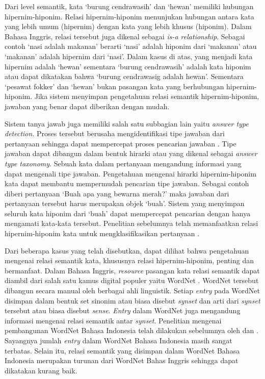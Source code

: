 Dari level semantik, kata `burung cendrawasih' dan `hewan' memiliki hubungan hipernim-hiponim. Relasi hipernim-hiponim menunjukan hubungan antara kata yang lebih umum (hipernim) dengan kata yang lebih khusus (hiponim). Dalam Bahasa Inggris, relasi tersebut juga dikenal sebagai \textit{is-a relationship}. Sebagai contoh `nasi adalah makanan' berarti `nasi' adalah hiponim dari `makanan' atau `makanan' adalah hipernim dari `nasi'. Dalam kasus di atas, yang menjadi kata hipernim adalah `hewan' sementara `burung cendrawasih' adalah kata hiponim atau dapat dikatakan bahwa `burung cendrawasig adalah hewan'. Sementara `pesawat fokker' dan `hewan' bukan pasangan kata yang berhubungan hipernim-hiponim. Jika sistem menyimpan pengetahuan relasi semantik hipernim-hiponim, jawaban yang benar dapat diberikan dengan mudah.

Sistem tanya jawab juga memiliki salah satu subbagian lain yaitu \textit{answer type detection}. Proses tersebut berusaha mengidentifikasi tipe jawaban dari pertanyaan sehingga dapat mempercepat proses pencarian jawaban \citep{jurafsky2000speech}. Tipe jawaban dapat dibangun dalam bentuk hirarki atau yang dikenal sebagai \textit{answer type taxonomy}. Sebuah kata dalam pertanyaan mengandung informasi yang dapat mengenali tipe jawaban. Pengetahuan mengenai hirarki hipernim-hiponim kata dapat membantu mempermudah pencarian tipe jawaban. Sebagai contoh diberi pertanyaan `Buah apa yang bewarna merah?' maka jawaban dari pertanyaan tersebut harus merupakan objek `buah'. Sistem yang menyimpan seluruh kata hiponim dari `buah' dapat mempercepat pencarian dengan hanya mengamati kata-kata tersebut. Penelitian sebelumnya telah memanfaatkan relasi hipernim-hiponim kata untuk mengklasifikasikan pertanyaan \citep{huang2008question}.

Dari beberapa kasus yang telah disebutkan, dapat dilihat bahwa pengetahuan mengenai relasi semantik kata, khususnya relasi hipernim-hiponim, penting dan bermanfaat. Dalam Bahasa Inggris, \textit{resource} pasangan kata relasi semantik dapat diambil dari salah satu kamus digital populer yaitu WordNet \citep{fellbaum1998wordnet}. WordNet tersebut dibangun secara manual oleh berbagai ahli linguistik. Setiap \textit{entry} pada WordNet disimpan dalam bentuk set sinonim atau biasa disebut \textit{synset} dan arti dari \textit{synset} tersebut atau biasa disebut \textit{sense}. \textit{Entry} dalam WordNet juga mengandung informasi mengenai relasi semantik antar \textit{synset}. Penelitian mengenai pembangunan WordNet Bahasa Indonesia telah dilakukan sebelumnya oleh  \cite{putra2008building} dan \citep{noor2011creating}. Sayangnya jumlah \textit{entry} dalam WordNet Bahasa Indonesia masih sangat terbatas. Selain itu, relasi semantik yang disimpan dalam WordNet Bahasa Indonesia merupakan turunan dari WordNet Bahas Inggris sehingga dapat dikatakan kurang baik.

